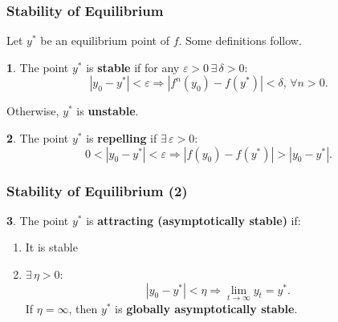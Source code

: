 \documentclass[10pt,usenames,dvipsnames]{beamer}
\theoremstyle{definition}
\newtheorem{definition}{\translate{Definition}}
\begin{document}
\begin{frame}[fragile]
\frametitle{Stability of Equilibrium}
Let $y^{*}$ be an equilibrium point of $f$. Some definitions follow.
\begin{definition}
	The point $y^{*}$ is \textbf{stable} if for any $\varepsilon > 0\,\exists\, \delta > 0$:
\[
	|y_{0} - y^{*}| < \varepsilon \Rightarrow |f^{n}(y_{0}) - f(y^{*})| < \delta, \, \forall n > 0.
\]

Otherwise, $y^{*}$ is \textbf{unstable}.
\end{definition}

\begin{definition}
	The point $y^{*}$ is \textbf{repelling} if $\exists\,\varepsilon > 0$:
\[
	0 < |y_{0} - y^{*}| < \varepsilon \Rightarrow |f(y_{0}) - f(y^{*})| > |y_{0} - y^{*}|.
\]
\end{definition}
\end{frame}

\begin{frame}[fragile]
\frametitle{Stability of Equilibrium (2)}
\begin{definition}
	The point $y^{*}$ is \textbf{attracting (asymptotically stable)} if:
	\begin{enumerate}
		\item It is stable
		\item $\exists\,\eta > 0$:
		\[
			|y_{0} - y^{*}| < \eta \Rightarrow \lim_{t\to\infty}y_{t} = y^{*}.
		\]
		If $\eta = \infty$, then $y^{*}$ is \textbf{globally asymptotically stable}.
	\end{enumerate}		 
\end{definition}
\end{frame}
\end{document}
